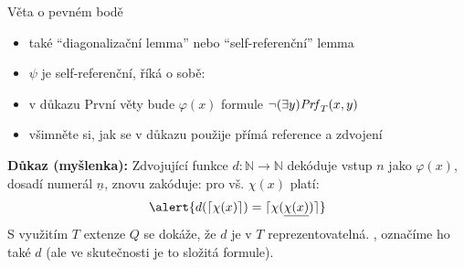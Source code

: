 \documentclass{beamer}
\begin{document}
\begin{frame}{Věta o pevném bodě}
    
    \pause

    \pause
    \begin{itemize}
        \item také ``diagonalizační lemma'' nebo ``self-referenční'' lemma\pause
        \item $\psi$ je \alert{self-referenční}, říká o sobě: \pause
        \item v důkazu První věty bude $\varphi(x)$ formule $\neg(\exists y)\mathit{Prf}_T(x,y)$\pause
        \item všimněte si, jak se v důkazu použije přímá reference a zdvojení
    \end{itemize}

    \pause
    \textbf{Důkaz (myšlenka):} \alert{Zdvojující funkce} $d\colon\mathbb N\to\mathbb N$ dekóduje vstup $n$ jako $\varphi(x)$, dosadí numerál $\underline{n}$, znovu zakóduje: pro vš. $\chi(x)$ platí:
    $$
    \alert{d(\lceil \chi(x)\rceil)=\lceil\chi(\underline{\chi(x)})\rceil}
    $$
    \pause
    S využitím $T$ extenze $Q$ se dokáže, že $d$ je v $T$ \alert{reprezentovatelná}. , označíme ho také $d$ (ale ve skutečnosti je to složitá formule).
    
\end{frame}
\end{document}
